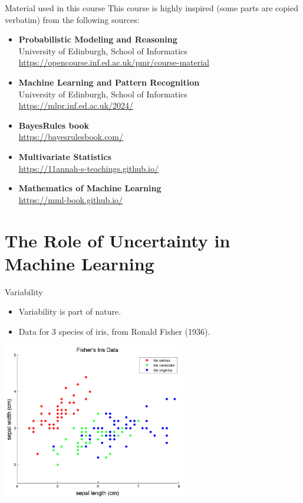 \documentclass{beamer}
\begin{document}
\begin{frame}{Material used in this course}
  This course is highly inspired (some parts are copied verbatim) from the following sources:
  \begin{itemize}
  \item \textbf{Probabilistic Modeling and Reasoning}\\
    University of Edinburgh, School of Informatics
    \url{https://opencourse.inf.ed.ac.uk/pmr/course-material}
  \item \textbf{Machine Learning and Pattern Recognition}\\
    University of Edinburgh, School of Informatics
    \url{https://mlpr.inf.ed.ac.uk/2024/}\\
    \item \textbf{BayesRules book}\\
      \url{https://bayesrulesbook.com/}
  \item \textbf{Multivariate Statistics}\\
    \url{https://11annah-s-teachings.github.io/}
    \item \textbf{Mathematics of Machine Learning}\\
      \url{https://mml-book.github.io/}
  \end{itemize}
\end{frame}


\section{The Role of Uncertainty in Machine Learning}

\begin{frame}{Variability}
\begin{itemize}
  \item Variability is part of nature.
  \item Data for 3 species of iris, from Ronald Fisher (1936).
\end{itemize}
\begin{center}
  \includegraphics[width=0.6\textwidth]{iris_data.png}
\end{center}
\end{frame}
\end{document}
